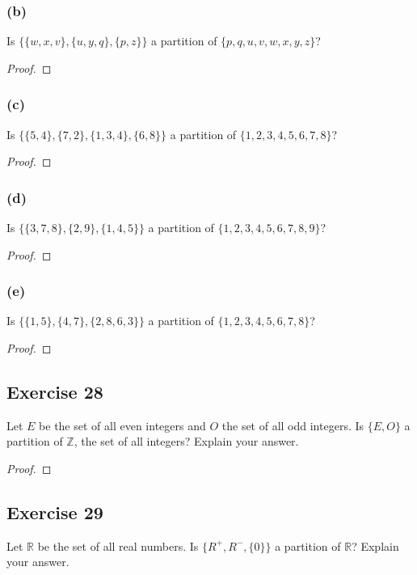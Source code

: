 \documentclass[14pt]{extarticle}
\newcommand{\R}{\mathbb{R}}
\newcommand{\Z}{\mathbb{Z}}
\begin{document}
\subsubsection{(b)}
Is \(\{\{w, x, v\}, \{u, y, q\}, \{p, z\}\}\) a partition of \(\{p, q, u, v, w, x, y, z\}\)?

\begin{proof}

\end{proof}

\subsubsection{(c)}
Is \(\{\{5, 4\}, \{7, 2\}, \{1, 3, 4\}, \{6, 8\}\}\) a partition of \(\{1, 2, 3, 4, 5, 6, 7, 8\}\)?

\begin{proof}

\end{proof}

\subsubsection{(d)}
Is \(\{\{3, 7, 8\}, \{2, 9\}, \{1, 4, 5\}\}\) a partition of \(\{1, 2, 3, 4, 5, 6, 7, 8, 9\}\)?

\begin{proof}

\end{proof}

\subsubsection{(e)}
Is \(\{\{1, 5\}, \{4, 7\}, \{2, 8, 6, 3\}\}\) a partition of \(\{1, 2, 3, 4, 5, 6, 7, 8\}\)?

\begin{proof}

\end{proof}

\subsection{Exercise 28}
Let $E$ be the set of all even integers and $O$ the set of all odd integers. Is \(\{E, O\}\) a partition of $\Z$, the set of all integers? Explain your answer.

\begin{proof}

\end{proof}

\subsection{Exercise 29}
Let $\R$ be the set of all real numbers. Is $\{R^+, R^-, \{0\}\}$ a partition of $\R$? Explain your answer.
\end{document}
